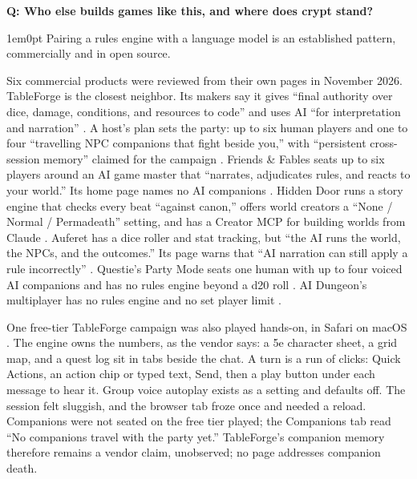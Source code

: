 \documentclass[11pt,letterpaper]{article}
\newcounter{faqnum}
\newenvironment{faqpair}[1]{%
  \needspace{4\baselineskip}\vspace{0.5em}\refstepcounter{faqnum}%
  \noindent\textbf{\color{SectionBlue}Q\thefaqnum: #1}\par\nopagebreak[4]%
  \vspace{0.2em}\begin{adjustwidth}{1em}{0pt}\setlength{\parindent}{0pt}%
}{\end{adjustwidth}\vspace{0.5em}}
\begin{document}
\begin{faqpair}{Who else builds games like this, and where does crypt stand?}\label{faq:landscape}
Pairing a rules engine with a language model is an established pattern,
commercially and in open source.

Six commercial products were reviewed from their own pages in November
2026. TableForge is the closest neighbor. Its makers say it gives ``final
authority over dice, damage, conditions, and resources to code'' and uses
AI ``for interpretation and narration''
\cite{tableforge2026multiplayercompare}. A host's plan sets the party: up
to six human players and one to four ``travelling NPC companions that
fight beside you,'' with ``persistent cross-session memory'' claimed for
the campaign \cite{tableforge2026home,tableforge2026faq}. Friends \& Fables
seats up to six players around an AI game master that ``narrates,
adjudicates rules, and reacts to your world.'' Its home page names no AI
companions \cite{fables2026home}. Hidden Door runs a story
engine that checks every beat ``against canon,'' offers world creators a
``None / Normal / Permadeath'' setting, and has a Creator MCP for building
worlds from Claude \cite{hiddendoor2026home}. Auferet has a dice roller and
stat tracking, but ``the AI runs the world, the NPCs, and the outcomes.''
Its page warns that ``AI narration can still apply a rule incorrectly''
\cite{auferet2026multiplayer}. Questie's Party Mode seats one human with up
to four voiced AI companions and has no rules engine beyond a d20 roll
\cite{questie2026partymode}. AI Dungeon's multiplayer has no rules engine
and no set player limit \cite{latitude2026multiplayerfaq}.

One free-tier TableForge campaign was also played hands-on, in Safari on
macOS \cite{freeman2026tableforgehandson}. The engine owns the numbers, as
the vendor says: a 5e character sheet, a grid map, and a quest log sit in
tabs beside the chat. A turn is a run of clicks: Quick Actions, an action
chip or typed text, Send, then a play button under each message to hear
it. Group voice autoplay exists as a setting and defaults off. The session
felt sluggish, and the browser tab froze once and needed a reload.
Companions were not seated on the free tier played; the Companions tab
read ``No companions travel with the party yet.'' TableForge's companion
memory therefore remains a vendor claim, unobserved; no page addresses
companion death.


\end{faqpair}
\end{document}
